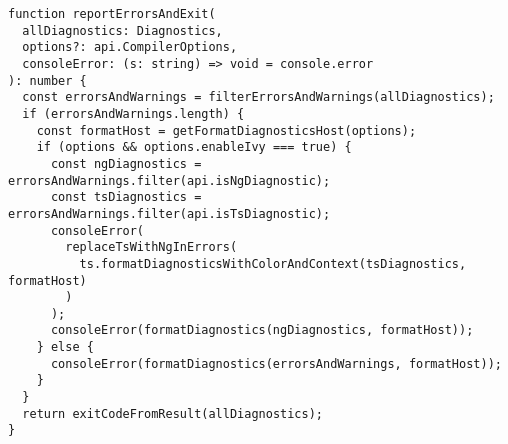 \begin{verbatim}
function reportErrorsAndExit(
  allDiagnostics: Diagnostics,
  options?: api.CompilerOptions,
  consoleError: (s: string) => void = console.error
): number {
  const errorsAndWarnings = filterErrorsAndWarnings(allDiagnostics);
  if (errorsAndWarnings.length) {
    const formatHost = getFormatDiagnosticsHost(options);
    if (options && options.enableIvy === true) {
      const ngDiagnostics = errorsAndWarnings.filter(api.isNgDiagnostic);
      const tsDiagnostics = errorsAndWarnings.filter(api.isTsDiagnostic);
      consoleError(
        replaceTsWithNgInErrors(
          ts.formatDiagnosticsWithColorAndContext(tsDiagnostics, formatHost)
        )
      );
      consoleError(formatDiagnostics(ngDiagnostics, formatHost));
    } else {
      consoleError(formatDiagnostics(errorsAndWarnings, formatHost));
    }
  }
  return exitCodeFromResult(allDiagnostics);
}
\end{verbatim}
